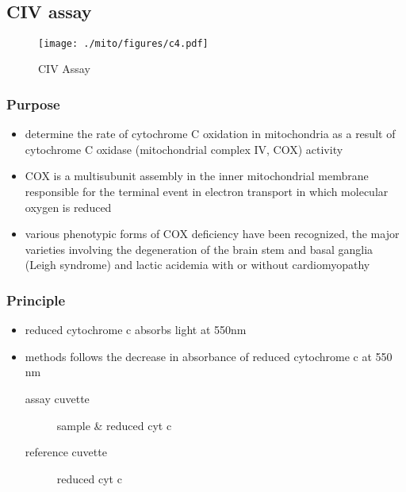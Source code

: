 \documentclass[12pt]{scrartcl}
\begin{document}
{\small{}}
\\

\subsection{CIV assay}
\label{sec:org2502829}
\begin{figure}[htbp]
\centering
\texttt{[image: ./mito/figures/c4.pdf]}
\caption{\label{fig:org47a7913}CIV Assay}
\end{figure}

\subsubsection{Purpose}
\label{sec:org5048972}
\begin{itemize}
\item determine the rate of cytochrome C oxidation in mitochondria as a
result of cytochrome C oxidase (mitochondrial complex IV, COX)
activity
\item COX is a multisubunit assembly in the inner mitochondrial membrane
responsible for the terminal event in electron transport in which
molecular oxygen is reduced
\item various phenotypic forms of COX deficiency have been recognized, the
major varieties involving the degeneration of the brain stem and
basal ganglia (Leigh syndrome) and lactic acidemia with or without
cardiomyopathy
\end{itemize}

\subsubsection{Principle}
\label{sec:org12196e8}
\begin{itemize}
\item reduced cytochrome c absorbs light at 550nm
\item methods follows the decrease in absorbance of reduced cytochrome c
at 550 nm
\begin{description}
\item[{assay cuvette}] sample \& reduced cyt c
\item[{reference cuvette}] reduced cyt c
\end{description}
\end{itemize}

{\small{}}
\end{document}
